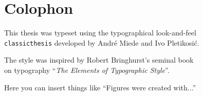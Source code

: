 \thispagestyle{plain}

\hfill

\vfill


\section*{Colophon}
\noindent This thesis was typeset using the typographical look-and-feel\\
\texttt{classicthesis} developed by Andr\'e Miede and Ivo Pletikosić.\bigskip

\noindent The style was inspired by Robert Bringhurst's seminal book\\
on typography ``\emph{The Elements of Typographic Style}''.\bigskip

\noindent Here you can insert things like ``Figures were created with...''\bigskip

